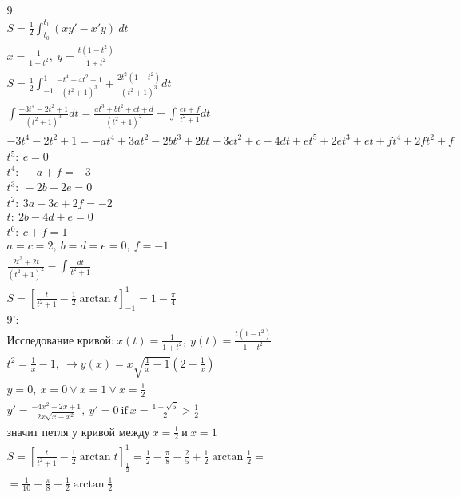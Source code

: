 \begin{multline}
    \text{9:}\\
    S = \frac{1}{2} \int_{t_0}^{t_1} (xy' - x'y)\ dt\\
    x = \frac{1}{1 + t^2},\ y = \frac{t(1 - t^2)}{1 + t^2}\\
    S = \frac{1}{2} \int_{-1}^{1} \frac{-t^4 - 4t^2 + 1}{(t^2 + 1)^3} + \frac{2t^2(1 - t^2)}{(t^2 + 1)^3} dt\\
    \int \frac{-3t^4 - 2t^2 + 1}{(t^2 + 1)^3} dt = \frac{at^3 + bt^2 + ct + d}{(t^2 + 1)^2} + \int \frac{et + f}{t^2 + 1} dt\\
    -3t^4 - 2t^2 + 1 = -at^4 + 3at^2 - 2bt^3 + 2bt - 3ct^2 + c - 4dt + et^5 + 2et^3 + et + ft^4 + 2ft^2 + f\\
    t^5:\ e = 0\\
    t^4:\ -a + f = -3\\
    t^3:\ -2b + 2e = 0\\
    t^2:\ 3a - 3c + 2f = -2\\
    t:\ 2b - 4d + e = 0\\
    t^0:\ c + f = 1\\
    a = c = 2,\ b = d = e = 0,\ f = -1\\
    \frac{2t^3 + 2t}{(t^2 + 1)^2} - \int \frac{dt}{t^2 + 1}\\
    S = [\frac{t}{t^2 + 1} - \frac{1}{2} \arctan{t}]_{-1}^{1} =
    1 - \frac{\pi}{4}\\
    \text{9':}\\
    \text{Исследование кривой:}\ x(t) = \frac{1}{1 + t^2},\ y(t) = \frac{t(1 - t^2)}{1 + t^2}\\
    t^2 = \frac{1}{x} - 1,\ \to y(x) = x\sqrt{\frac{1}{x} - 1}(2 - \frac{1}{x})\\
    y = 0,\ x = 0 \lor x = 1 \lor x = \frac{1}{2}\\
    y' = \frac{-4x^2 + 2x + 1}{2x \sqrt{x - x^2}},\ y' = 0\ \text{if}\
    x = \frac{1 + \sqrt{5}}{2} > \frac{1}{2}\\
    \text{значит петля у кривой между}\ x = \frac{1}{2}\ \text{и}\ x = 1\\
    S = [\frac{t}{t^2 + 1} - \frac{1}{2}\arctan{t}]_{\frac{1}{2}}^{1} = 
    \frac{1}{2} - \frac{\pi}{8} - \frac{2}{5} + \frac{1}{2} \arctan{\frac{1}{2}} =\\
    = \frac{1}{10} - \frac{\pi}{8} + \frac{1}{2} \arctan{\frac{1}{2}}\\
\end{multline}


